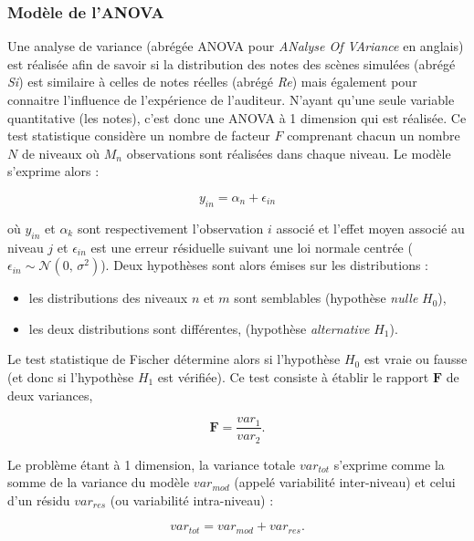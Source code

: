 \subsubsection{Modèle de l'ANOVA}
Une analyse de variance (abrégée ANOVA pour \textit{ANalyse Of VAriance} en anglais) est réalisée afin de savoir si la distribution des notes des scènes simulées (abrégé \textit{Si}) est similaire à celles de notes réelles (abrégé \textit{Re}) mais également pour connaitre l'influence de l'expérience de l'auditeur. N'ayant qu'une seule variable quantitative (les notes), c'est donc une ANOVA à 1 dimension qui est réalisée. Ce test statistique considère un nombre de facteur $F$ comprenant chacun un nombre $N$ de niveaux où $M_n$ observations sont réalisées dans chaque niveau. Le modèle s'exprime alors : 

\begin{equation}
y_{in} = \alpha_n + \epsilon_{in}
\end{equation}

où $y_{in}$  et $\alpha_k$ sont respectivement l'observation $i$ associé et l'effet moyen associé au niveau $j$ et $\epsilon_{in}$ est une erreur résiduelle suivant une loi normale centrée ($\epsilon_{in} \sim \mathcal{N}(0,\,\sigma^{2})$). Deux hypothèses sont alors émises sur les distributions : 

\begin{itemize}
\item les distributions des niveaux $n$ et $m$ sont semblables (hypothèse \textit{nulle} $H_0$),
\item les deux distributions sont différentes, (hypothèse \textit{alternative} $H_1$).\\
\end{itemize}

Le test statistique de Fischer détermine alors si l'hypothèse $H_0$ est vraie ou fausse (et donc si l'hypothèse $H_1$ est vérifiée). Ce test consiste à établir le rapport $\mathbf{F}$ de deux variances, 
 
\begin{equation}
\mathbf{F} = \frac{var_1}{var_2}.
\end{equation}

Le problème étant à 1 dimension, la variance totale $var_{tot}$ s'exprime comme la somme de la variance du modèle $var_{mod}$ (appelé variabilité inter-niveau) et celui d'un résidu $var_{res}$ (ou variabilité intra-niveau) : 

\begin{equation}
var_{tot} = var_{mod} + var_{res}.
\end{equation}

